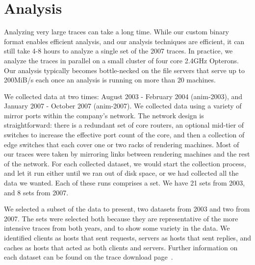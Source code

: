 \section{Analysis}
\label{sec:analysis}





Analyzing very large traces can take a long time.  While our custom
binary format enables efficient analysis, and our analysis techniques
are efficient, it can still take 4-8 hours to analyze a single set of
the 2007 traces.  In practice, we analyze the traces in parallel on a
small cluster of four core 2.4GHz Opterons.  Our analysis typically
becomes bottle-necked on the file servers that serve up to 200MiB/s each
once an analysis is running on more than 20 machines.

We collected data at two times: August 2003 - February 2004 (anim-2003), and January 2007 - October 2007
(anim-2007).  We collected data using a variety of mirror
ports within the company's network.
The network design is
straightforward: there is a redundant set of core routers, an
optional mid-tier of switches to increase the effective port count of
the core, and then a collection of edge switches that each cover one
or two racks of rendering machines.  Most of our traces were taken by
mirroring links between rendering machines and the rest of the network.
For each collected dataset, we would start the collection
process, and let it run either until we ran out of disk space, or we
had collected all the data we wanted.  Each of these runs comprises a
set.  We have 21 sets from 2003, and 8 sets from 2007. 

We selected a subset of the data to present, two datasets from 2003
and two from 2007.  The sets were selected both because they are
representative of the more intensive traces from both years, and to
show some variety in the data.  We identified clients as hosts that
sent requests, servers as hosts that sent replies, and caches as hosts
that acted as both clients and servers. Further information on each
dataset can be found on the trace download
page~\cite{animation-bear-traces}.

